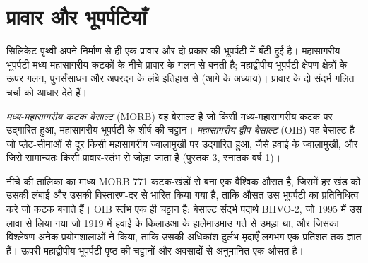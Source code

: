 \section{प्रावार और भूपर्पटियाँ}

सिलिकेट पृथ्वी अपने निर्माण से ही एक प्रावार और दो
प्रकार की भूपर्पटी में बँटी हुई है। महासागरीय भूपर्पटी मध्य-महासागरीय कटकों के नीचे प्रावार के
गलन से बनती है; महाद्वीपीय भूपर्पटी क्षेपण क्षेत्रों के ऊपर गलन, पुनर्संसाधन और
अपरदन के लंबे इतिहास से (आगे के अध्याय)। प्रावार के दो संदर्भ गलित
चर्चा को आधार देते हैं।

\begin{definition}[मध्य-महासागरीय कटक बेसाल्ट, महासागरीय द्वीप बेसाल्ट]
\label{def:b2:elements-in-the-earth:morb-oib}
\emph{मध्य-महासागरीय कटक बेसाल्ट} (MORB) वह बेसाल्ट है
जो किसी मध्य-महासागरीय कटक पर उद्गारित हुआ, महासागरीय भूपर्पटी के शीर्ष की चट्टान।
\emph{महासागरीय द्वीप बेसाल्ट} (OIB) वह बेसाल्ट है जो
प्लेट-सीमाओं से दूर किसी महासागरीय ज्वालामुखी पर उद्गारित हुआ, जैसे हवाई के ज्वालामुखी,
और जिसे सामान्यतः किसी प्रावार-स्तंभ से जोड़ा जाता है (पुस्तक 3, स्नातक वर्ष 1)।
\end{definition}

नीचे की तालिका का माध्य MORB 771 कटक-खंडों से बना एक वैश्विक औसत है,
जिसमें हर खंड को उसकी लंबाई और उसकी विस्तारण-दर से भारित किया गया है, ताकि
औसत उस भूपर्पटी का प्रतिनिधित्व करे जो कटक बनाते हैं। OIB
स्तंभ एक ही चट्टान है: बेसाल्ट संदर्भ पदार्थ BHVO-2, जो 1995 में
उस लावा से लिया गया जो 1919 में हवाई के किलाउआ के हालेमाउमाउ गर्त से उमड़ा था,
और जिसका विश्लेषण अनेक प्रयोगशालाओं ने किया, ताकि उसकी अधिकांश दुर्लभ मृदाएँ
लगभग एक प्रतिशत तक ज्ञात हैं। ऊपरी महाद्वीपीय भूपर्पटी पृष्ठ की चट्टानों और अवसादों से
अनुमानित एक औसत है।

